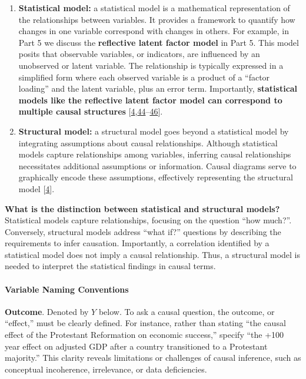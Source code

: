 \documentclass[
  singlecolumn]{article}
\let\oldparagraph\paragraph
\renewcommand{\paragraph}[1]{\oldparagraph{#1}\mbox{}}
\begin{document}
\begin{enumerate}
\def\labelenumi{\arabic{enumi}.}
\setcounter{enumi}{15}
\item
  \textbf{Statistical model:} a statistical model is a mathematical
  representation of the relationships between variables. It provides a
  framework to quantify how changes in one variable correspond with
  changes in others. For example, in Part 5 we discuss the
  \textbf{reflective latent factor model} in Part 5. This model posits
  that observable variables, or indicators, are influenced by an
  unobserved or latent variable. The relationship is typically expressed
  in a simplified form where each observed variable is a product of a
  ``factor loading'' and the latent variable, plus an error term.
  Importantly, \textbf{statistical models like the reflective latent
  factor model can correspond to multiple causal structures}
  {[}\protect\hyperlink{ref-hernuxe1n2023}{4},\protect\hyperlink{ref-wright1920}{44}--\protect\hyperlink{ref-pearl2018}{46}{]}.
\item
  \textbf{Structural model:} a structural model goes beyond a
  statistical model by integrating assumptions about causal
  relationships. Although statistical models capture relationships among
  variables, inferring causal relationships necessitates additional
  assumptions or information. Causal diagrams serve to graphically
  encode these assumptions, effectively representing the structural
  model {[}\protect\hyperlink{ref-hernuxe1n2023}{4}{]}.
\end{enumerate}

\textbf{What is the distinction between statistical and structural
models?} Statistical models capture relationships, focusing on the
question ``how much?''. Conversely, structural models address ``what
if?'' questions by describing the requirements to infer causation.
Importantly, a correlation identified by a statistical model does not
imply a causal relationship. Thus, a structural model is needed to
interpret the statistical findings in causal terms.

\hypertarget{variable-naming-conventions}{%
\paragraph{\texorpdfstring{\textbf{Variable Naming
Conventions}}{Variable Naming Conventions}}\label{variable-naming-conventions}}

\textbf{Outcome}. Denoted by \(Y\) below. To ask a causal question, the
outcome, or ``effect,'' must be clearly defined. For instance, rather
than stating ``the causal effect of the Protestant Reformation on
economic success,'' specify ``the +100 year effect on adjusted GDP after
a country transitioned to a Protestant majority.'' This clarity reveals
limitations or challenges of causal inference, such as conceptual
incoherence, irrelevance, or data deficiencies.
\end{document}
